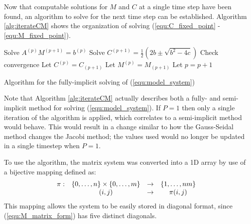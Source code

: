 Now that computable solutions for $M$ and $C$ at a single time step have been found, an algorithm to solve for the next time step can be established.
Algorithm \ref{alg:iterateCM} shows the organization of solving (\ref{equ:C_fixed_point} - \ref{equ:M_fixed_point}). 
\begin{algorithm}
  \Begin
  {
    {
        Solve $A^{(p)} M^{(p+1)} = b^{(p)}$\;
        Solve $C^{(p+1)} = \frac{1}{2} \left( 2b \pm \sqrt{b^2 - 4c} \right)$\;
        Check convergence\; 
        Let $C^{(p)} = C_{(p+1)}$\;
        Let $M^{(p)} = M_{(p+1)}$\;
        Let $p = p + 1 $\;
    }
  }
  \caption{Algorithm for the fully-implicit solving of (\ref{equ:model_system}) }
  \label{alg:iterateCM}
\end{algorithm}
Note that Algorithm \ref{alg:iterateCM} actually describes both a fully- and semi- implicit method for solving (\ref{equ:model_system}). 
If $P = 1$ then only a single iteration of the algorithm is applied, which correlates to a semi-implicit method would behave.
This would result in a change similar to how the Gauss-Seidal method changes the Jacobi method; the values used would no longer be updated in a single timestep when $P = 1$.

To use the algorithm, the matrix system was converted into a 1D array by use of a bijective mapping defined as:
\begin{equation}
\begin{array}{c c c c}
  \pi :& \{ 0, \ldots, n\} \times \{0, \ldots, m\} & \to & \{1, \ldots, nm \} \\
       & (i,j)                                     & \to & \pi(i,j)
\end{array}
\end{equation}
This mapping allows the system to be easily stored in diagonal format, since (\ref{equ:M_matrix_form}) has five distinct diagonals.


